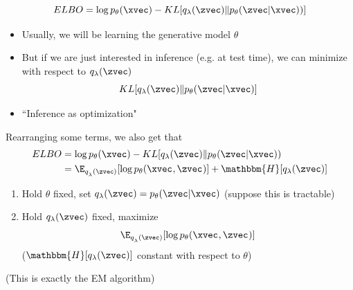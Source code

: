 \begin{frame}
  \begin{center}
   \end{center}   
   
  \[ ELBO = \log p_\theta(\xvec)- KL[ q_\lambda(\zvec) \Vert p_\theta(\zvec | \xvec)) ]  \]

\begin{itemize}
\item Usually, we will be learning the generative model $\theta$
\item But if we are just interested in inference (e.g. at test time), we can minimize with respect to $q_\lambda(\zvec)$
\[ KL[q_\lambda(\zvec) \Vert p_\theta(\zvec | \xvec)] \]
\item ``Inference as optimization"
\end{itemize}
\end{frame}


\begin{frame}
  \begin{center}
   \end{center}   
   Rearranging some terms, we also get that 
   \begin{align*}
    ELBO &= \log p_\theta(\xvec)- KL[ q_\lambda(\zvec) \Vert p_\theta(\zvec | \xvec)) \\
    &= \E_{q_\lambda^{}(\zvec)}[\log  p_\theta(\xvec^{} , \zvec^{}) ] + \mathbbm{H}[q_\lambda(\zvec)]
    \end{align*}
\begin{enumerate}
\item Hold $\theta$ fixed, set $q_\lambda(\zvec) = p_\theta (\zvec | \xvec) $ (suppose this is tractable)
\item Hold $q_\lambda(\zvec)$ fixed, maximize 
\[ \E_{q_\lambda^{}(\zvec)}[\log  p_\theta(\xvec^{} , \zvec^{}) ]  \]
($\mathbbm{H}[q_\lambda(\zvec)]$ constant with respect to $\theta$)
\end{enumerate}
(This is exactly the EM algorithm)
\end{frame}




